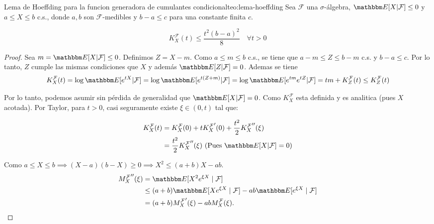 \begin{theorem}{Lema de Hoeffding para la funcion generadora de cumulantes condicional}{teo:lema-hoeffding}
    Sea \(\mathcal{F}\) una \(\sigma\)-álgebra, \(\E{X|\mathcal{F}} \leq 0\) y \(a \leq X \leq b\) c.s., donde \(a,b\) son \(\mathcal{F}\)-medibles y \(b-a\leq c\) para una constante finita \(c\).

    \begin{equation}  \label{eq:hoeffding}
        K_X^\mathcal{F}(t) \leq \dfrac{t^2(b-a)^2}{8} \quad \forall t>0
    \end{equation}

\end{theorem}

\begin{proof}
    Sea \(m = \E{X|\mathcal{F}}\leq 0\). Definimos \(Z = X-m\).
    Como \(a \leq m \leq b\) c.s., se tiene que \(a-m \leq Z \leq b-m\) c.s. y \(b-a \leq c\). Por lo tanto, \(Z\) cumple las mismas condiciones que \(X\) y además \(\E{Z|\mathcal{F}} = 0\).
    Ademas se tiene
    \[
        K_X^\mathcal{F}(t) = \log \E{e^{tX}|\mathcal{F}} = \log \E{e^{t(Z+m)}|\mathcal{F}} = \log \E{e^{tm}e^{tZ}|\mathcal{F}} = tm + K_Z^\mathcal{F}(t) \leq K_Z^\mathcal{F}(t)
    \]

    Por lo tanto, podemos asumir sin pérdida de generalidad que \(\E{X|\mathcal{F}} = 0\).
    Como \(K_X^\mathcal{F}\) esta definida y es analitica (pues \(X\) acotada). Por Taylor, para \(t>0\), casi seguramente existe \(\xi \in (0,t)\) tal que:

    \begin{align}
        K_X^\mathcal{F}(t) & = K_X^\mathcal{F}(0) + t{K_X^\mathcal{F}}'(0) + \frac{t^2}{2}{K_X^\mathcal{F}}''(\xi) \nonumber \\
                           & = \frac{t^2}{2}{K_X^\mathcal{F}}''(\xi) \text{ (Pues } \E{X|\mathcal{F}} = 0)
    \end{align}

    Como \(a\leq X\leq b \implies (X-a)(b-X)\geq0 \implies X^2\leq(a+b)X-ab\).
    \begin{align*}
        {M_X^{\mathcal F}}''(\xi)
         & =\E{X^2e^{\xi X}\mid\mathcal F}                                       \\
         & \leq(a+b) \E{Xe^{\xi X}\mid\mathcal F} -ab\E{e^{\xi X}\mid\mathcal F} \\
         & =(a+b){M_X^{\mathcal F}}'(\xi)-abM_X^{\mathcal F}(\xi).
    \end{align*}


\end{proof}
